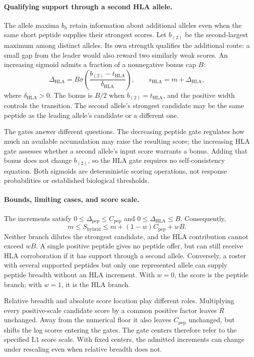 \documentclass[11pt]{article}
\begin{document}
\paragraph{Qualifying support through a second HLA allele.}
The allele maxima \(b_h\) retain information about additional alleles even
when the same short peptide supplies their strongest scores. Let
\(b_{(2)}\) be the second-largest maximum among distinct alleles. Its
own strength qualifies the additional route: a small gap from the leader
would also reward two similarly weak scores. An increasing sigmoid admits
a fraction of a nonnegative bonus cap \(B\):
\begin{equation}
\Delta_{\mathrm{HLA}}
=B\sigma\!\left(\frac{b_{(2)}-t_{\mathrm{HLA}}}
{\delta_{\mathrm{HLA}}}\right),
\qquad s_{\mathrm{HLA}}=m+\Delta_{\mathrm{HLA}},
\label{eq:l2_hla_gate}
\end{equation}
where \(\delta_{\mathrm{HLA}}>0\). The bonus is \(B/2\) when
\(b_{(2)}=t_{\mathrm{HLA}}\), and the positive width controls the
transition. The second allele's strongest candidate may be the same peptide
as the leading allele's candidate or a different one.

The gates answer different questions. The decreasing peptide gate regulates
how much an available accumulation may raise the resulting score; the
increasing HLA gate assesses whether a second allele's input score warrants
a bonus. Adding that bonus does not change \(b_{(2)}\), so the HLA gate
requires no self-consistency equation. Both sigmoids are deterministic
scoring operations, not response probabilities or established biological
thresholds.

\paragraph{Bounds, limiting cases, and score scale.}
The increments satisfy \(0\leq\Delta_{\mathrm{pep}}\leq C_{\mathrm{pep}}\)
and \(0\leq\Delta_{\mathrm{HLA}}\leq B\). Consequently,
\[
m\leq S_{\mathrm{hybrid}}
\leq m+(1-w)C_{\mathrm{pep}}+wB.
\]
Neither branch dilutes the strongest candidate, and the HLA contribution
cannot exceed \(wB\). A single positive peptide gives no peptide offer,
but can still receive HLA corroboration if it has support through a second
allele. Conversely, a roster with several supported peptides but only one
represented allele can supply peptide breadth without an HLA increment.
With \(w=0\), the score
is the peptide branch; with \(w=1\), it is the HLA branch.

Relative breadth and absolute score location play different roles. Multiplying
every positive-scale candidate score by a common positive factor leaves
\(R\) unchanged. Away from the numerical floor it also leaves
\(C_{\mathrm{pep}}\) unchanged, but shifts the log scores entering the
gates. The gate centers therefore refer to the specified \(\mathrm{L1}\)
score scale. With fixed centers, the admitted increments can change under
rescaling even when relative breadth does not.
\end{document}
